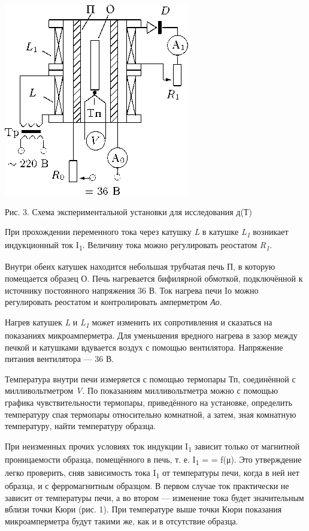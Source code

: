 \documentclass[]{article}
\begin{document}
\includegraphics{./media/image3.png}

Рис. 3. Схема экспериментальной установки для исследования д(Т)

При прохождении переменного тока через катушку \emph{L} в ка­тушке
\emph{L\textsubscript{1}} возникает индукционный ток I\textsubscript{1}.
Величину тока можно регу­лировать реостатом \emph{R\textsubscript{1}.}

Внутри обеих катушек находится небольшая трубчатая печь П, в ко­торую
помещается образец О. Печь нагревается бифилярной обмоткой, подключённой
к источнику постоянного напряжения 36 В. Ток нагрева печи Iо можно
регулировать реостатом и контролировать ампермет­ром \emph{Ао.}

Нагрев катушек \emph{L} и \emph{L\textsubscript{1}} может изменить их
сопротивления и сказать­ся на показаниях микроамперметра. Для уменьшения
вредного нагрева в зазор между печкой и катушками вдувается воздух с
помощью вен­тилятора. Напряжение питания вентилятора --- 36 В.

Температура внутри печи измеряется с помощью термопары Тп, со­единённой
с милливольтметром \emph{V.} По показаниям милливольтметра можно с
помощью графика чувствительности термопары, приведённо­го на установке,
определить температуру спая термопары относительно комнатной, а затем,
зная комнатную температуру, найти температуру образца.

При неизменных прочих условиях ток индукции I\textsubscript{1} зависит
только от магнитной проницаемости образца, помещённого в печь, т. е.
I\textsubscript{1} = = f(μ). Это утверждение легко проверить, сняв
зависимость тока I\textsubscript{1} от температуры печи, когда в ней нет
образца, и с ферромагнитным образцом. В первом случае ток практически не
зависит от температу­ры печи, а во втором --- изменение тока будет
значительным вблизи точки Кюри (рис. 1). При температуре выше точки Кюри
показания микроамперметра будут такими же, как и в отсутствие образца.
\end{document}
